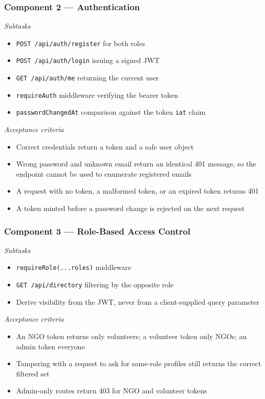 \documentclass[11pt,letterpaper]{article}
\begin{document}
\subsubsection*{Component 2 --- Authentication}
\textit{Subtasks}
\begin{itemize}
  \item \texttt{POST /api/auth/register} for both roles
  \item \texttt{POST /api/auth/login} issuing a signed JWT
  \item \texttt{GET /api/auth/me} returning the current user
  \item \texttt{requireAuth} middleware verifying the bearer token
  \item \texttt{passwordChangedAt} comparison against the token \texttt{iat} claim
\end{itemize}
\textit{Acceptance criteria}
\begin{itemize}
  \item Correct credentials return a token and a safe user object
  \item Wrong password and unknown email return an identical 401 message, so the
        endpoint cannot be used to enumerate registered emails
  \item A request with no token, a malformed token, or an expired token returns 401
  \item A token minted before a password change is rejected on the next request
\end{itemize}

\subsubsection*{Component 3 --- Role-Based Access Control}
\textit{Subtasks}
\begin{itemize}
  \item \texttt{requireRole(...roles)} middleware
  \item \texttt{GET /api/directory} filtering by the opposite role
  \item Derive visibility from the JWT, never from a client-supplied query parameter
\end{itemize}
\textit{Acceptance criteria}
\begin{itemize}
  \item An NGO token returns only volunteers; a volunteer token only NGOs;
        an admin token everyone
  \item Tampering with a request to ask for same-role profiles still returns
        the correct filtered set
  \item Admin-only routes return 403 for NGO and volunteer tokens
\end{itemize}
\end{document}
